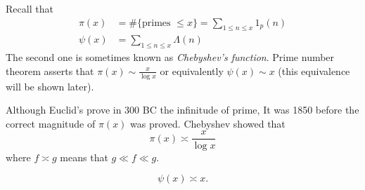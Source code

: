 \documentclass[a4paper]{article}
\begin{document}
Recall that
\begin{align*}
  \pi(x) &= \# \{\text{primes } \leq x\} = \sum_{1 \leq n \leq x} 1_p(n) \\
  \psi(x) &= \sum_{1 \leq n \leq x} \Lambda(n)
\end{align*}
The second one is sometimes known as \emph{Chebyshev's function}. Prime number theorem asserts that \(\pi(x) \sim \frac{x}{\log x}\) or equivalently \(\psi(x) \sim x\) (this equivalence will be shown later).

Although Euclid's prove in 300 BC the infinitude of prime, It was 1850 before the correct magnitude of \(\pi(x)\) was proved. Chebyshev showed that
\[
  \pi(x) \asymp \frac{x}{\log x}
\]
where \(f \asymp g\) means that \(g \ll f \ll g\).

\begin{theorem}[Chebyshev]
  \[
    \psi(x) \asymp x.
  \]
\end{theorem}
\end{document}
